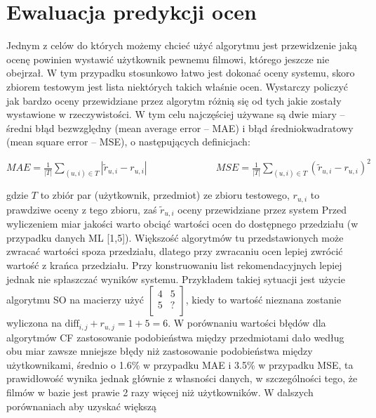 \documentclass{pracamgr}
\begin{document}
  \section{Ewaluacja predykcji ocen}
   Jednym z celów do których możemy chcieć użyć algorytmu jest przewidzenie jaką ocenę powinien wystawić użytkownik pewnemu filmowi, którego jeszcze nie obejrzał.
   W tym przypadku stosunkowo łatwo jest dokonać oceny systemu, skoro zbiorem testowym jest lista niektórych takich właśnie ocen.
   Wystarczy policzyć jak bardzo oceny przewidziane przez algorytm różnią się od tych jakie zostały wystawione w rzeczywistości.
   W tym celu najczęściej używane są dwie miary -- średni błąd bezwzględny (mean average error -- MAE) i błąd średniokwadratowy (mean square error -- MSE),
   o następujących definicjach:\newline
   \begin{center}
    $
    MAE=\frac{1}{|T|}\sum\limits_{(u,i)\in T}|\tilde{r}_{u,i}-r_{u,i}|\quad\quad\quad\quad\quad\quad\quad
    MSE=\frac{1}{|T|}\sum\limits_{(u,i)\in T}(\tilde{r}_{u,i}-r_{u,i})^2
    $
   \end{center}
   {\scriptsize
    gdzie $T$ to zbiór par (użytkownik, przedmiot) ze zbioru testowego, $r_{u,i}$ to prawdziwe oceny z tego zbioru,\newline
    zaś $\tilde{r}_{u,i}$ oceny przewidziane przez system
   }\newline
   Przed wyliczeniem miar jakości warto obciąć wartości ocen do dostępnego przedziału (w przypadku danych ML [1,5]).
   Większość algorytmów tu przedstawionych może zwracać wartości spoza przedziału, dlatego przy zwracaniu ocen lepiej zwrócić wartość z krańca przedziału.
   Przy konstruowaniu list rekomendacyjnych lepiej jednak nie spłaszczać wyników systemu.\newline
   Przykładem takiej sytuacji jest użycie algorytmu SO na macierzy użyć
   $\left[\begin{array}{cc}
    4&5\\
    5&?\\
   \end{array}\right]$, kiedy to wartość nieznana zostanie wyliczona na $\text{diff}_{i,j}+r_{u,j}=1+5=6$.\newline
   W porównaniu wartości błędów dla algorytmów CF zastosowanie podobieństwa między przedmiotami dało według obu miar zawsze mniejsze błędy
   niż zastosowanie podobieństwa między użytkownikami, średnio o 1.6\% w przypadku MAE i 3.5\% w przypadku MSE, ta prawidłowość wynika jednak głównie
   z własności danych, w szczególności tego, że filmów w bazie jest prawie 2 razy więcej niż użytkowników. W dalszych porównaniach aby uzyskać większą
\end{document}
